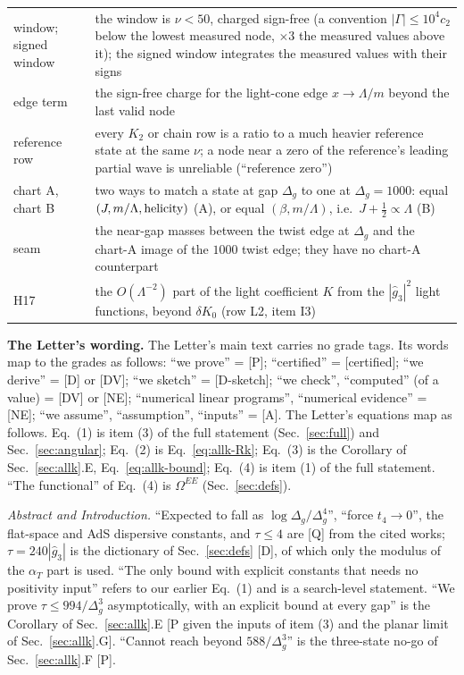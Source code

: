 \documentclass[aps,prl,onecolumn,superscriptaddress,nofootinbib]{revtex4-2}
\begin{document}
\begin{center}
\begin{tabular}{@{}L{2.9cm}L{13.4cm}@{}}
window; signed window & the window is $\nu<50$, charged sign-free (a convention $|\Gamma|\le10^4c_2$ below the lowest measured node, $\times3$ the measured values above it); the signed window integrates the measured values with their signs\\
edge term & the sign-free charge for the light-cone edge $x\to\Lambda/m$ beyond the last valid node\\
reference row & every $K_2$ or chain row is a ratio to a much heavier reference state at the same $\nu$; a node near a zero of the reference's leading partial wave is unreliable (``reference zero'')\\
chart A, chart B & two ways to match a state at gap $\Delta_g$ to one at $\Delta_g=1000$: equal $(J,m/\Lambda,{\rm helicity})$ (A), or equal $(\beta,m/\Lambda)$, i.e.\ $J+\tfrac12\propto\Lambda$ (B)\\
seam & the near-gap masses between the twist edge at $\Delta_g$ and the chart-A image of the $1000$ twist edge; they have no chart-A counterpart\\
H17 & the $O(\Lambda^{-2})$ part of the light coefficient $K$ from the $|\hat g_3|^2$ light functions, beyond $\delta K_0$ (row L2, item I3)\\
\bottomrule
\end{tabular}
\end{center}

\textbf{The Letter's wording.} The Letter's main text carries no grade tags. Its words map to the grades as
follows: ``we prove'' = [P]; ``certified'' = [certified]; ``we derive'' = [D] or [DV]; ``we sketch'' = [D-sketch]; ``we check'',
``computed'' (of a value) = [DV] or [NE]; ``numerical linear programs'', ``numerical evidence'' = [NE]; ``we assume'', ``assumption'',
``inputs'' = [A]. The Letter's equations map as follows. Eq.~(1) is item (3) of the full statement (Sec.~\ref{sec:full}) and
Sec.~\ref{sec:angular}; Eq.~(2) is Eq.~\eqref{eq:allk-Rk}; Eq.~(3) is the Corollary of Sec.~\ref{sec:allk}.E, Eq.~\eqref{eq:allk-bound};
Eq.~(4) is item (1) of the full statement. ``The functional'' of Eq.~(4) is $\Omega^{EE}$ (Sec.~\ref{sec:defs}).

\emph{Abstract and Introduction.} ``Expected to fall as $\log\Delta_g/\Delta_g^4$'', ``force $t_4\to0$'', the flat-space and AdS dispersive
constants, and $\tau\le4$ are [Q] from the cited works; $\tau=240|\hat g_3|$ is the dictionary of Sec.~\ref{sec:defs} [D], of which only the
modulus of the $\alpha_T$ part is used. ``The only bound with explicit constants that needs no positivity input'' refers to our earlier
Eq.~(1) and is a search-level statement. ``We prove $\tau\le994/\Delta_g^3$ asymptotically, with an explicit bound at every gap'' is the
Corollary of Sec.~\ref{sec:allk}.E [P given the inputs of item (3) and the planar limit of Sec.~\ref{sec:allk}.G]. ``Cannot reach beyond
$588/\Delta_g^3$'' is the three-state no-go of Sec.~\ref{sec:allk}.F [P].
\end{document}
